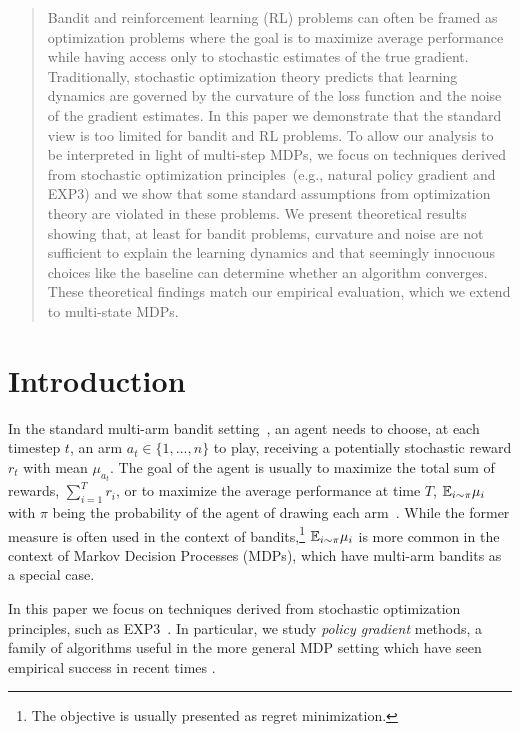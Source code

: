 \begin{abstract}


Bandit and reinforcement learning (RL) problems can often be framed as optimization problems where the goal is to maximize average performance while having access only to stochastic estimates of the true gradient. Traditionally, stochastic optimization theory predicts that learning dynamics are governed by the curvature of the loss function and the noise of the gradient estimates. In this paper we demonstrate that the standard view is too limited for bandit and RL problems. To allow our analysis to be interpreted in light of multi-step MDPs, we focus on techniques derived from stochastic optimization principles~(e.g., natural policy gradient and EXP3) and we show that some standard assumptions from optimization theory are violated in these problems. We present theoretical results showing that, at least for bandit problems, curvature and noise are not sufficient to explain the learning dynamics and that seemingly innocuous choices like the baseline can determine whether an algorithm converges. These theoretical findings match our empirical evaluation, which we extend to multi-state MDPs.
\end{abstract}

\section{Introduction}
In the standard multi-arm bandit setting~\cite{robbins1952some}, an agent needs to choose, at each timestep $t$, an arm $a_t \in \{1, ..., n\}$ to play, receiving a potentially stochastic reward $r_t$ with mean $\mu_{a_t}$. The goal of the agent is usually to maximize the total sum of rewards, $\sum_{i=1}^T r_i$, or to maximize the average performance at time $T$, $\mathbb{E}_{i\sim \pi} \mu_i$ with $\pi$ being the probability of the agent of drawing each arm~\citep{bubeck2012regret}. While the former measure is often used in the context of bandits,\footnote{The objective is usually presented as regret minimization.} $\mathbb{E}_{i\sim \pi} \mu_i$ is more common in the context of Markov Decision Processes (MDPs), which have multi-arm bandits as a special case.

In this paper we focus on techniques derived from stochastic optimization principles, such as EXP3~\citep{auer2002nonstochastic, seldin2013evaluation}. %
In particular, we study \textit{policy gradient} methods, a family of algorithms useful in the more general MDP setting which have seen empirical success in recent times \cite{schulman2017proximal}. 


